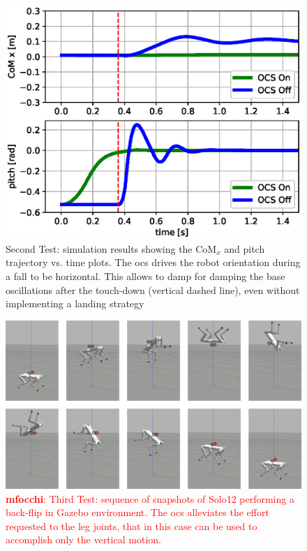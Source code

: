 \documentclass[sensors,article,submit,pdftex,moreauthors]{Definitions/mdpi}
\newcommand{\MF}[1]{\textcolor{red}{\textbf{mfocchi}: #1}}
\begin{document}
\begin{figure}[t!]
	\centering
	\includegraphics[width=.7\linewidth]{figures/fall_plot.eps}
	\caption{\small Second Test: simulation results showing the $\mathrm{CoM}_x$ and pitch trajectory vs. time plots. The \gls{ocs} drives the robot orientation during a fall to be horizontal. This allows to damp for damping the base oscillations after the touch-down (vertical dashed line), even without implementing a landing strategy}
	\label{fig:fall_plot}
\end{figure}
\begin{figure}[h!]
	\centering
	\includegraphics[width=\linewidth]{figures/backflip.png}
	\caption{\small \MF{Third Test: sequence of snapshots of Solo12 performing a back-flip in Gazebo environment. The \gls{ocs} alleviates the effort requested to the leg joints, that in this case can be used to accomplish only the vertical motion.}}
	\label{fig:backflip}
\end{figure}
\end{document}
